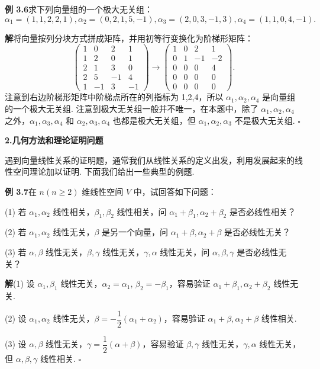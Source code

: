 \documentclass[UTF8,12pt,a4paper,fontset=fandol]{ctexart}
\begin{document}
\noindent\textbf{例 3.6}\quad 求下列向量组的一个极大无关组：
\[
\alpha_1=(1,1,2,2,1),\alpha_2=(0,2,1,5,-1),\alpha_3=(2,0,3,-1,3),\alpha_4=(1,1,0,4,-1).
\]

\noindent\textbf{解}\quad 将向量按列分块方式拼成矩阵，并用初等行变换化为阶梯形矩阵：
\[
\begin{pmatrix}
1 & 0 & 2 & 1\\
1 & 2 & 0 & 1\\
2 & 1 & 3 & 0\\
2 & 5 & -1 & 4\\
1 & -1 & 3 & -1
\end{pmatrix}
\to
\begin{pmatrix}
1 & 0 & 2 & 1\\
0 & 1 & -1 & -2\\
0 & 0 & 0 & 4\\
0 & 0 & 0 & 0\\
0 & 0 & 0 & 0
\end{pmatrix}.
\]
注意到右边阶梯形矩阵中阶梯点所在的列指标为 1,2,4，所以 $\alpha_1,\alpha_2,\alpha_4$ 是向量组的一个极大无关组. 注意到极大无关组一般并不唯一，在本题中，除了 $\alpha_1,\alpha_2,\alpha_4$ 之外，$\alpha_1,\alpha_3,\alpha_4$ 和 $\alpha_2,\alpha_3,\alpha_4$ 也都是极大无关组，但 $\alpha_1,\alpha_2,\alpha_3$ 不是极大无关组. $\square$

\noindent\textbf{2.\quad 几何方法和理论证明问题}

遇到向量线性关系的证明题，通常我们从线性关系的定义出发，利用发展起来的线性空间理论加以证明. 下面我们给出一些典型的例题.

\noindent\textbf{例 3.7}\quad 在 $n(n\ge 2)$ 维线性空间 $V$ 中，试回答如下问题：

(1) 若 $\alpha_1,\alpha_2$ 线性相关，$\beta_1,\beta_2$ 线性相关，问 $\alpha_1+\beta_1,\alpha_2+\beta_2$ 是否必线性相关？

(2) 若 $\alpha_1,\alpha_2$ 线性无关，$\beta$ 是另一个向量，问 $\alpha_1+\beta,\alpha_2+\beta$ 是否必线性无关？

(3) 若 $\alpha,\beta$ 线性无关，$\beta,\gamma$ 线性无关，$\gamma,\alpha$ 线性无关，问 $\alpha,\beta,\gamma$ 是否必线性无关？

\noindent\textbf{解}\quad (1) 设 $\alpha_1,\beta_1$ 线性无关，$\alpha_2=\alpha_1$, $\beta_2=-\beta_1$，容易验证 $\alpha_1+\beta_1,\alpha_2+\beta_2$ 线性无关.

(2) 设 $\alpha_1,\alpha_2$ 线性无关，$\beta=-\dfrac{1}{2}(\alpha_1+\alpha_2)$，容易验证 $\alpha_1+\beta,\alpha_2+\beta$ 线性相关.

(3) 设 $\alpha,\beta$ 线性无关，$\gamma=\dfrac{1}{2}(\alpha+\beta)$，容易验证 $\beta,\gamma$ 线性无关，$\gamma,\alpha$ 线性无关，但 $\alpha,\beta,\gamma$ 线性相关. $\square$
\end{document}
